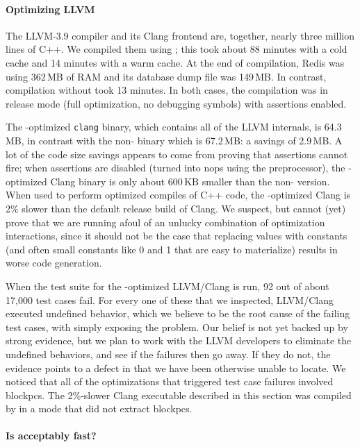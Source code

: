 \paragraph{Optimizing LLVM}

The LLVM-3.9 compiler and its Clang frontend are, together, nearly
three million lines of C++.
%
We compiled them using \tool{}; this took about 88 minutes with a cold
cache and 14 minutes with a warm cache.
%
At the end of compilation, Redis was using 362\,MB of RAM and its
database dump file was 149\,MB.
%
In contrast, compilation without \tool{} took 13 minutes.
%
In both cases, the compilation was in release mode (full optimization,
no debugging symbols) with assertions enabled.


The \tool{}-optimized \texttt{clang} binary, which contains all of the
LLVM internals, is 64.3\,MB, in contrast with the non-\tool{}
binary which is 67.2\,MB: a savings of 2.9\,MB\@.
%
A lot of the code size savings appears to come from proving that
assertions cannot fire; when assertions are disabled (turned into nops
using the preprocessor), the \tool-optimized Clang binary is only
about 600\,KB smaller than the non-\tool{} version.
%
When used to perform optimized compiles of C++ code, the
\tool-optimized Clang is 2\% slower than the default release build of
Clang.
%
We suspect, but cannot (yet) prove that we are running afoul of an
unlucky combination of optimization interactions, since it should not
be the case that replacing values with constants (and often small
constants like 0 and 1 that are easy to materialize) results in worse
code generation.


When the test suite for the \tool{}-optimized LLVM/Clang is run, 92
out of about 17,000 test cases fail.
%
For every one of these that we inspected, LLVM/Clang executed
undefined behavior, which we believe to be the root cause of the
failing test cases, with \tool{} simply exposing the problem.
%
Our belief is not yet backed up by strong evidence, but we plan to work
with the LLVM developers to eliminate the undefined behaviors, and see
if the failures then go away.
%
If they do not, the evidence points to a defect in \tool{} that
we have been otherwise unable to locate.
%
We noticed that all of the \tool{} optimizations that triggered test
case failures involved blockpcs.
%
The 2\%-slower Clang executable described in this section was compiled
by \tool{} in a mode that did not extract blockpcs.


\paragraph{Is \tool{} acceptably fast?}

